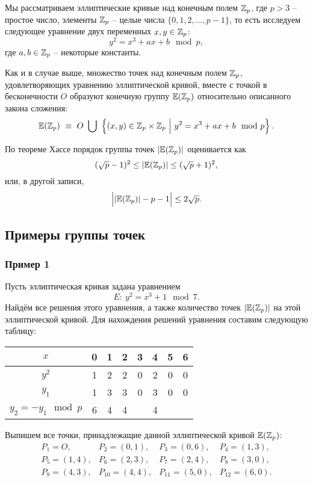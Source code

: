 Мы рассматриваем эллиптические кривые над конечным полем $\mathbb{Z}_p$, где $p > 3$ -- простое число, элементы $\mathbb{Z}_p$ -- целые числа $\{0, 1, 2, \ldots, p-1\}$, то есть исследуем следующее уравнение двух переменных $x, y \in \mathbb{Z}_p$:
    \[ y^2 = x^3 + a x + b \mod p, \]
где $a, b \in \mathbb{Z}_p$ -- некоторые константы.

Как и в случае выше, множество точек над конечным полем $\mathbb{Z}_p$, удовлетворяющих уравнению эллиптической кривой, вместе с точкой в бесконечности $O$ образуют конечную группу $\mathbb{E}(\mathbb{Z}_p)$ относительно описанного закона сложения:
    \[ \mathbb{E}(\mathbb{Z}_p) ~ \equiv~  O ~ \bigcup ~
        \left\{ (x, y) \in \mathbb{Z}_p \times \mathbb{Z}_p ~\Big|~ y^2 = x^3 + a x + b \mod p \right\}. \]

По теореме Хассе порядок группы точек $|\mathbb{E}(\mathbb{Z}_p)|$ оценивается как
    \[ (\sqrt{p}-1)^2 \leq |\mathbb{E}(\mathbb{Z}_p)| \leq (\sqrt{p}+1)^2, \]
или, в другой записи,
    \[ \Big| |\mathbb{E}(\mathbb{Z}_p)| - p - 1 \Big| \le 2 \sqrt{p}. \]

\subsection{Примеры группы точек}

\subsubsection{Пример 1}

Пусть эллиптическая кривая задана уравнением
    \[ E: ~ y^2 = x^3 + 1 \mod 7. \]
Найдём все решения этого уравнения, а также количество точек $|\mathbb{E}(\mathbb{Z}_p)|$ на этой эллиптической кривой. Для нахождения решений уравнения составим следующую таблицу:

\begin{center} \begin{tabular}{|c|c|c|c|c|c|c|c|}
    \hline
    $x$ & 0 & 1 & 2 & 3 & 4 & 5 & 6 \\
    \hline
    $y^2$ & 1 & 2 & 2 & 0 & 2 & 0 & 0 \\
    \hline
    $y_1$ & 1 & 3 & 3 & 0 & 3 & 0 & 0 \\
    \hline
    $y_2 = - y_1 \mod p$ & 6 & 4 & 4 &   & 4 &   &   \\
    \hline
\end{tabular} \end{center}

Выпишем все точки, принадлежащие данной эллиптической кривой $\mathbb{E}(\mathbb{Z}_p)$:
\[
    \begin{array}{cccc}
        P_1 = O, & P_2 = (0,1), & P_3 = (0,6), & P_4 = (1,3), \\
        P_5 = (1,4), & P_6 = (2,3), & P_7 = (2,4), & P_8 = (3,0), \\
        P_9 = (4,3), & P_{10} = (4,4), & P_{11} = (5,0), & P_{12} = (6,0). \\
    \end{array}
\]

